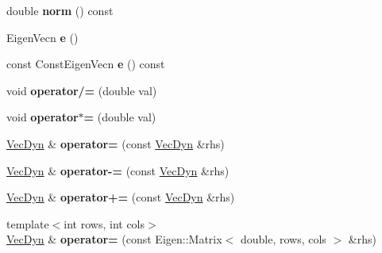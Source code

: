 \begin{DoxyCompactItemize}
\item 
\mbox{\label{classraisim_1_1VecDyn_aa871b492b64ff729be497347a98c2c90}} 
double {\bfseries norm} () const
\item 
\mbox{\label{classraisim_1_1VecDyn_a96f808bf64e6319b9a32871e148c9b86}} 
Eigen\+Vecn {\bfseries e} ()
\item 
\mbox{\label{classraisim_1_1VecDyn_a39e71ffed0530dd128025115807a1a4c}} 
const Const\+Eigen\+Vecn {\bfseries e} () const
\item 
\mbox{\label{classraisim_1_1VecDyn_a39ed5e2cf4f5e4fc22bbaf0c813a0f92}} 
void {\bfseries operator/=} (double val)
\item 
\mbox{\label{classraisim_1_1VecDyn_a3fdb3d078534fabe50a717b5f2dbaff2}} 
void {\bfseries operator$\ast$=} (double val)
\item 
\mbox{\label{classraisim_1_1VecDyn_a999b8de6971ea9510f1874a44f7eb7ff}} 
\hyperlink{classraisim_1_1VecDyn}{Vec\+Dyn} \& {\bfseries operator=} (const \hyperlink{classraisim_1_1VecDyn}{Vec\+Dyn} \&rhs)
\item 
\mbox{\label{classraisim_1_1VecDyn_ac90d33f9170b418537db5a88493bf826}} 
\hyperlink{classraisim_1_1VecDyn}{Vec\+Dyn} \& {\bfseries operator-\/=} (const \hyperlink{classraisim_1_1VecDyn}{Vec\+Dyn} \&rhs)
\item 
\mbox{\label{classraisim_1_1VecDyn_a7678446c3a14bbe3cff8698119ba46c3}} 
\hyperlink{classraisim_1_1VecDyn}{Vec\+Dyn} \& {\bfseries operator+=} (const \hyperlink{classraisim_1_1VecDyn}{Vec\+Dyn} \&rhs)
\item 
\mbox{\label{classraisim_1_1VecDyn_af876b6329d4eed35a167ce6e7599394f}} 
{\footnotesize template$<$int rows, int cols$>$ }\\\hyperlink{classraisim_1_1VecDyn}{Vec\+Dyn} \& {\bfseries operator=} (const Eigen\+::\+Matrix$<$ double, rows, cols $>$ \&rhs)
\item 
\mbox{\label{classraisim_1_1VecDyn_af62e1e375e1bc209b1cba0d1468a9ca6}} 

\end{DoxyCompactItemize}
